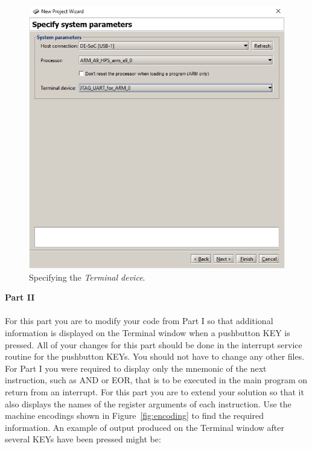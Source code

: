 \documentclass[epsfig,10pt,fullpage]{article}
\begin{document}
\begin{figure}[htb]
	\begin{center}
	\includegraphics[scale=0.58]{figures/terminal.png}
	\end{center}
	\vspace{-0.25cm}\caption{Specifying the {\it Terminal device}.}
\label{fig:terminal}
\end{figure}

\noindent
{\bf Part II}
~\\
~\\
For this part you are to modify your code from Part I so that additional information is
displayed on the Terminal window when a pushbutton KEY is pressed. All of your changes for
this part should be done in the interrupt service routine for the pushbutton KEYs. You
should not have to change any other files. For Part I you were required to display only 
the mnemonic of the next instruction, such as AND or EOR, that is to be executed in the
main program on return from an interrupt. For this part you are to extend your solution
so that it also displays the names of the register arguments of each instruction. Use the
machine encodings shown in Figure~\ref{fig:encoding} to find the required information. An 
example of output produced on the Terminal window after several KEYs have been pressed
might be:
\end{document}
